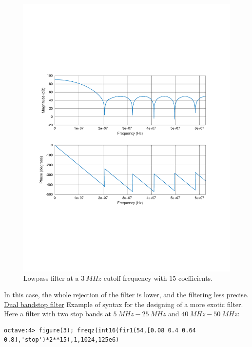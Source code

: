 \documentclass[12pt,oneside]{article}
\begin{document}
\begin{figure}[!h!tb]
	\begin{center}
		\includegraphics[width=12cm,trim={1.5cm 6.9cm 1.5cm 7cm}, clip]{curves/lp15co.pdf}
		\caption{Lowpass filter at a $3~MHz$ cutoff frequency with $15$ coefficients.}
		\label{curv:LP2}
	\end{center}
\end{figure}
\vspace{-0.5cm}
In this case, the whole rejection of the filter is lower, and the filtering less precise.
\newline\newline
\underline{Dual bandstop filter}\newline\newline
Example of syntax for the designing of a more exotic filter. Here a filter with two stop bands at $5~MHz-25~MHz$ and $40~MHz-50~MHz$:

\vspace{-0.1cm}
\begin{lstlisting}
octave:4> figure(3); freqz(int16(fir1(54,[0.08 0.4 0.64 0.8],'stop')*2**15),1,1024,125e6)
\end{lstlisting}
\vspace{-0cm}
\end{document}
